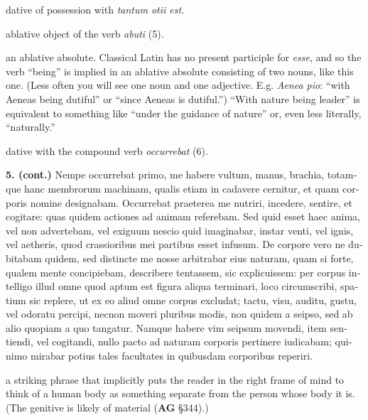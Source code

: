  dative of possession with \textit{tantum otii est}.

 ablative object of the verb \textit{abuti} (5).

 an ablative absolute. Classical Latin has no present participle for \textit{esse}, and so the verb ``being'' is implied in an ablative absolute consisting of two nouns, like this one. (Less often you will see one noun and one adjective. E.g. \textit{Aenea pio}: ``with Aeneas being dutiful'' or ``since Aeneas is dutiful.'') ``With nature being leader'' is equivalent to something like ``under the guidance of nature'' or, even less literally, ``naturally.''

 dative with the compound verb \textit{occurrebat} (6).

\clearpage

\beginnumbering
\pstart
{}
\begin{latin}
    \textenglish{\textbf{5. (cont.)}} Nempe occurrebat primo, me habere vultum, manus, brachia, totamque hanc membrorum machinam, qualis etiam in cadavere cernitur, et quam corporis nomine designabam. Occurrebat praeterea me nutriri, incedere, sentire, et cogitare: quas quidem actiones ad animam referebam. Sed quid esset haec anima, vel non advertebam, vel exiguum nescio quid imaginabar, instar venti, vel ignis, vel aetheris, quod crassioribus mei partibus esset infusum. De corpore vero ne dubitabam quidem, sed distincte me nosse arbitrabar eius naturam, quam si forte, qualem mente concipiebam, describere tentassem, sic explicuissem: per corpus intelligo illud omne quod aptum est figura aliqua terminari, loco circumscribi, spatium sic replere, ut ex eo aliud omne corpus excludat; tactu, visu, auditu, gustu, vel odoratu percipi, necnon moveri pluribus modis, non quidem a seipso, sed ab alio quopiam a quo tangatur. Namque habere vim seipsum movendi, item sentiendi, vel cogitandi, nullo pacto ad naturam corporis pertinere iudicabam; quinimo mirabar potius tales facultates in quibusdam corporibus reperiri.
\end{latin}
\pend
\endnumbering

\prenotes

 a striking phrase that implicitly puts the reader in the right frame of mind to think of a human body as something separate from the person whose body it is. (The genitive is likely of material (\textbf{AG} §344).)


